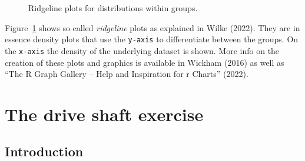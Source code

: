 \documentclass[
  a4paper,
]{scrbook}
\begin{document}
\begin{figure}[ht]


\caption{\label{fig-groups-ridge}Ridgeline plots for distributions
within groups.}

\end{figure}%

Figure~\ref{fig-groups-ridge} shows so called \emph{ridgeline} plots as
explained in Wilke (2022). They are in essence density plots that use
the \texttt{y-axis} to differentiate between the groups. On the
\texttt{x-axis} the density of the underlying dataset is shown. More
info on the creation of these plots and graphics is available in Wickham
(2016) as well as {``The {R} Graph Gallery -- Help and Inspiration for r
Charts''} (2022).

\section{The drive shaft exercise}\label{the-drive-shaft-exercise}

\subsection{Introduction}\label{introduction}
\end{document}
